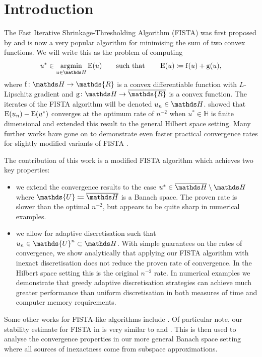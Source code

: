 \documentclass[10pt,a4paper,onecolumn]{article}
\numberwithin{equation}{section}
\let\F\mathds\let\C\mathcal\newcommand{\R}{\F{R}}\newcommand{\A}{\C{A}}
\newcommand{\op}[1]{\operatorname{#1}}\newcommand{\overtext}[2]{\stackrel{\text{#1}}{#2}}
\renewcommand{\bar}{\overline}\renewcommand{\hat}{\widehat}\renewcommand{\tilde}{\widetilde}
\DeclareMathOperator*{\argmin}{argmin}\DeclareMathOperator{\TV}{TV}
\newcommand*{\Func}[1]{%
	\IfEqCase{#1}{%
		{0}{\op{E}}%
		{1}{\op{F}}%
		{2}{\op{G}}%
		{3}{\op{H}}%
	}[\op{F}#1]%
}
\newcommand*{\func}[1]{%
	\IfEqCase{#1}{%
		{0}{\op{e}}%
		{1}{\op{f}}%
		{2}{\op{g}}%
		{3}{\op{h}}%
	}[\op{f}#1]%
}
\newcommand*{\varf}[1]{%
	\IfEqCase{#1}{%
		{0}{u}%
		{1}{v}%
		{2}{w}%
	}[u#1]%
}
\newcommand*{\spcf}[1]{%
	\IfEqCase{#1}{%
		{0}{\F{U}}%
		{1}{\F{V}}%
		{2}{\F{W}}%
	}[\F{U}#1]%
}
\begin{document}
\section{Introduction}
The Fast Iterative Shrinkage-Thresholding Algorithm (FISTA) was first proposed by \citet{Beck2009} and is now a very popular algorithm for minimising the sum of two convex functions. We will write this as the problem of computing 
\begin{equation}\label{eq: min F = fD+fC}
	u^* \in \argmin_{\varf0\in\F H}\Func0(\varf0)  \qquad\text{such that}\qquad \Func0(\varf0)\coloneqq \func1(\varf0) + \func2(\varf0),
\end{equation}
where $\func1\colon\F H\to\R$ is a convex differentiable function with $L$-Lipschitz gradient and $\func2\colon\F H\to\bar\R$ is a convex function. The iterates of the FISTA algorithm will be denoted $\varf0_n\in\F H$. \citet{Beck2009} showed that $\Func0(\varf0_n) - \Func0(\varf0^*)$ converges at the optimum rate of $n^{-2}$ when $u^*\in \F H$ is finite dimensional and \cite{Chambolle2015} extended this result to the general Hilbert space setting. Many further works have gone on to demonstrate even faster practical convergence rates for slightly modified variants of FISTA \citep{Tao2016,Liang2017,Alamo2019}.

The contribution of this work is a modified FISTA algorithm which achieves two key properties:
\begin{itemize}
	\item we extend the convergence results to the case $\varf0^*\in\bar{\F H}\setminus\F H$ where $\spcf0\coloneqq \bar{\F H}$ is a Banach space. The proven rate is slower than the optimal $n^{-2}$, but appears to be quite sharp in numerical examples.
	\item we allow for adaptive discretisation such that $\varf0_n\in\spcf0^n\subset\F H$. With simple guarantees on the rates of convergence, we show analytically that applying our FISTA algorithm with inexact discretisation does not reduce the proven rate of convergence. In the Hilbert space setting this is the original $n^{-2}$ rate. In numerical examples we demonstrate that greedy adaptive discretisation strategies can achieve much greater performance than uniform discretisation in both measures of time and computer memory requirements.
\end{itemize}
 Some other works for FISTA-like algorithms include \citep{Jiang2012,Villa2013}. Of particular note, our stability estimate for FISTA  in  is very similar to \cite[Proposition 2]{Schmidt2011} and \cite[Proposition 3.3]{Aujol2015}. This is then used to analyse the convergence properties in our more general Banach space setting where all sources of inexactness come from subspace approximations.
\end{document}
